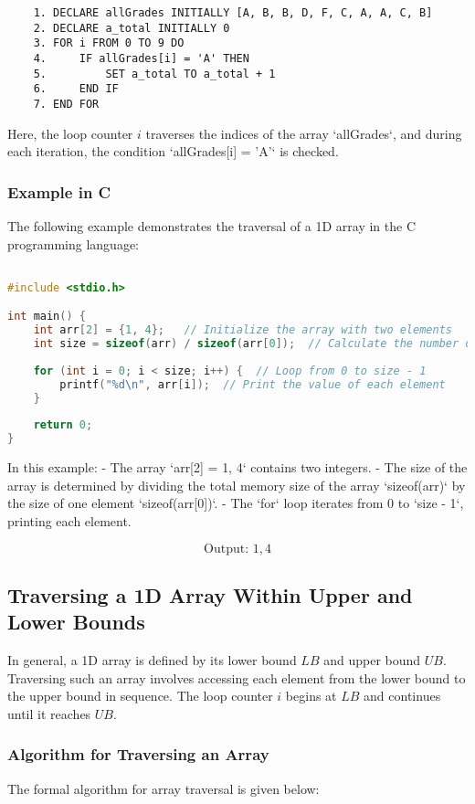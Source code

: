 \documentclass[12pt, oneside]{book}
\begin{document}
\begin{verbatim}
	1. DECLARE allGrades INITIALLY [A, B, B, D, F, C, A, A, C, B]
	2. DECLARE a_total INITIALLY 0
	3. FOR i FROM 0 TO 9 DO
	4.     IF allGrades[i] = 'A' THEN
	5.         SET a_total TO a_total + 1
	6.     END IF
	7. END FOR
\end{verbatim}
Here, the loop counter \( i \) traverses the indices of the array `allGrades`, and during each iteration, the condition `allGrades[i] = 'A'` is checked.

\subsubsection{Example in C}

The following example demonstrates the traversal of a 1D array in the C programming language:

\begin{lstlisting}[language=C, caption={Example C Code}]

#include <stdio.h>

int main() {
	int arr[2] = {1, 4};   // Initialize the array with two elements
	int size = sizeof(arr) / sizeof(arr[0]);  // Calculate the number of elements in the array
	
	for (int i = 0; i < size; i++) {  // Loop from 0 to size - 1
		printf("%d\n", arr[i]);  // Print the value of each element
	}
	
	return 0;
}
\end{lstlisting}
In this example:
- The array `arr[2] = {1, 4}` contains two integers.
- The size of the array is determined by dividing the total memory size of the array `sizeof(arr)` by the size of one element `sizeof(arr[0])`.
- The `for` loop iterates from 0 to `size - 1`, printing each element.

\[
\text{Output: } 1, 4
\]

\subsection{Traversing a 1D Array Within Upper and Lower Bounds}
In general, a 1D array is defined by its lower bound \( LB \) and upper bound \( UB \). Traversing such an array involves accessing each element from the lower bound to the upper bound in sequence. The loop counter \( i \) begins at \( LB \) and continues until it reaches \( UB \).

\subsubsection{Algorithm for Traversing an Array}
The formal algorithm for array traversal is given below:
\end{document}
